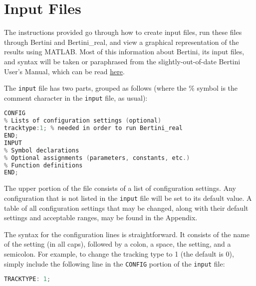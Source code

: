 
\section{Input Files}

\label{sec:input}


The instructions provided go through how to create input files, run these files through Bertini and Bertini\_real, and view a graphical representation of the results using MATLAB. Most of this information about Bertini, its input files, and syntax will be taken or paraphrased from the slightly-out-of-date Bertini User's Manual, which can be read \href{https://bertini.nd.edu/BertiniUsersManual.pdf}{here}. 


The \texttt{input} file has two parts, grouped as follows (where the \% symbol is the comment character in the \texttt{input} file, as usual):

\begin{center}\begin{minipage}{0.9\linewidth}

\begin{lstlisting}[language=c++, caption=Adapted from \cite{BM13}, captionpos=b]
CONFIG
% Lists of configuration settings (optional)
tracktype:1; % needed in order to run Bertini_real
END;
INPUT
% Symbol declarations
% Optional assignments (parameters, constants, etc.)
% Function definitions
END;
\end{lstlisting}
\end{minipage}\end{center}

The upper portion of the file consists of a list of configuration settings. Any configuration that is not listed in the \texttt{input} file will be set to its default value. A table of all configuration settings that may be changed, along with their default settings and acceptable ranges, may be found in the Appendix.\par
The syntax for the configuration lines is straightforward. It consists of the name of the setting (in all caps), followed by a colon, a space, the setting, and a semicolon. For example, to change the tracking type to 1 (the default is 0), simply include the following line in the \texttt{CONFIG} portion of the \texttt{input} file:

\begin{center}\begin{minipage}{0.9\linewidth}

\begin{lstlisting}[language=c++, caption=Adapted from \cite{BM13}, captionpos=b]
TRACKTYPE: 1;
\end{lstlisting}
\end{minipage}\end{center}


